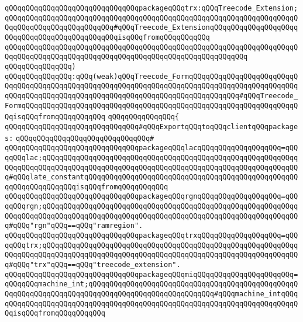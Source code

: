 \verb|qQQqqQQqqQQqqQQqqQQqqQQqqQQqqQQqpackageqQQqtrx:qQQqTreecode_Extension;qQQqqQQqqQQqqQQqqQQqqQQqqQQqqQQqqQQqqQQqqQQqqQQqqQQqqQQqqQQqqQQqqQQqqQQqqQQqqQQqqQQqqQQqqQQqqQQq#qQQqTreecode_ExtensionqQQqqQQqqQQqqQQqqQQqqQQqqQQqqQQqqQQqqQQqqQQqqQQqisqQQqfromqQQqqQQqqQQq|\newline
\verb|qQQqqQQqqQQqqQQqqQQqqQQqqQQqqQQqqQQqqQQqqQQqqQQqqQQqqQQqqQQqqQQqqQQqqQQqqQQqqQQqqQQqqQQqqQQqqQQqqQQqqQQqqQQqqQQqqQQqqQQqqQQqqQQq|\newline
\verb|qQQqqQQqqQQqqQQq)|\newline
\verb|qQQqqQQqqQQqqQQq:qQQq(weak)qQQqTreecode_FormqQQqqQQqqQQqqQQqqQQqqQQqqQQqqQQqqQQqqQQqqQQqqQQqqQQqqQQqqQQqqQQqqQQqqQQqqQQqqQQqqQQqqQQqqQQqqQQqqQQqqQQqqQQqqQQqqQQqqQQqqQQqqQQqqQQqqQQqqQQqqQQqqQQqqQQq#qQQqTreecode_FormqQQqqQQqqQQqqQQqqQQqqQQqqQQqqQQqqQQqqQQqqQQqqQQqqQQqqQQqqQQqqQQqqQQqisqQQqfromqQQqqQQqqQQq|\newline
\verb|qQQqqQQqqQQqqQQq{|\newline
\verb|qQQqqQQqqQQqqQQqqQQqqQQqqQQqqQQq#qQQqExportqQQqtoqQQqclientqQQqpackages:|\newline
\verb|qQQqqQQqqQQqqQQqqQQqqQQqqQQqqQQq#|\newline
\verb|qQQqqQQqqQQqqQQqqQQqqQQqqQQqqQQqpackageqQQqlacqQQqqQQqqQQqqQQqqQQq=qQQqqQQqlac;qQQqqQQqqQQqqQQqqQQqqQQqqQQqqQQqqQQqqQQqqQQqqQQqqQQqqQQqqQQqqQQqqQQqqQQqqQQqqQQqqQQqqQQqqQQqqQQqqQQqqQQqqQQqqQQqqQQqqQQqqQQqqQQqqQQq#qQQqlate_constantqQQqqQQqqQQqqQQqqQQqqQQqqQQqqQQqqQQqqQQqqQQqqQQqqQQqqQQqqQQqqQQqqQQqisqQQqfromqQQqqQQqqQQq|\newline
\verb|qQQqqQQqqQQqqQQqqQQqqQQqqQQqqQQqpackageqQQqrgnqQQqqQQqqQQqqQQqqQQq=qQQqqQQqrgn;qQQqqQQqqQQqqQQqqQQqqQQqqQQqqQQqqQQqqQQqqQQqqQQqqQQqqQQqqQQqqQQqqQQqqQQqqQQqqQQqqQQqqQQqqQQqqQQqqQQqqQQqqQQqqQQqqQQqqQQqqQQqqQQqqQQq#qQQq"rgn"qQQq==qQQq"ramregion".|\newline
\verb|qQQqqQQqqQQqqQQqqQQqqQQqqQQqqQQqpackageqQQqtrxqQQqqQQqqQQqqQQqqQQq=qQQqqQQqtrx;qQQqqQQqqQQqqQQqqQQqqQQqqQQqqQQqqQQqqQQqqQQqqQQqqQQqqQQqqQQqqQQqqQQqqQQqqQQqqQQqqQQqqQQqqQQqqQQqqQQqqQQqqQQqqQQqqQQqqQQqqQQqqQQqqQQq#qQQq"trx"qQQq==qQQq"treecode_extension".|\newline
\verb|qQQqqQQqqQQqqQQqqQQqqQQqqQQqqQQqpackageqQQqmiqQQqqQQqqQQqqQQqqQQqqQQq=qQQqqQQqmachine_int;qQQqqQQqqQQqqQQqqQQqqQQqqQQqqQQqqQQqqQQqqQQqqQQqqQQqqQQqqQQqqQQqqQQqqQQqqQQqqQQqqQQqqQQqqQQqqQQqqQQq#qQQqmachine_intqQQqqQQqqQQqqQQqqQQqqQQqqQQqqQQqqQQqqQQqqQQqqQQqqQQqqQQqqQQqqQQqqQQqqQQqqQQqisqQQqfromqQQqqQQqqQQq|\newline
